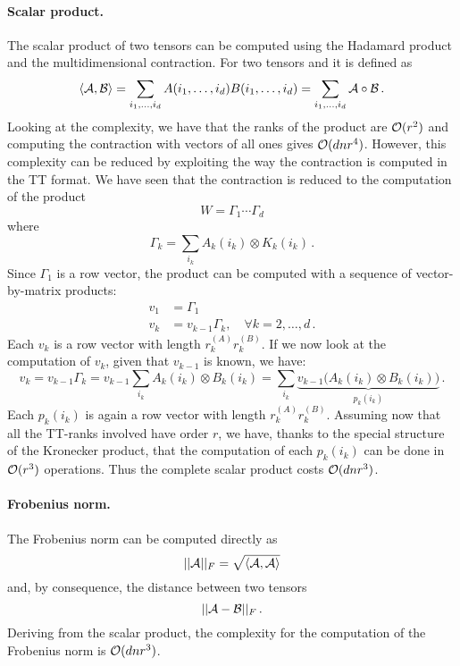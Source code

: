 \paragraph{Scalar product.}
The scalar product of two tensors can be computed using the Hadamard product and the multidimensional contraction. For two tensors \A and \B it is defined as
\begin{equation*}
  \langle \mathcal{A}, \mathcal{B} \rangle = \sum_{i_1,\ldots,i_d} A(i_1,\ldots,i_d)B(i_1,\ldots,i_d) = \sum_{i_1,\ldots,i_d} \mathcal{A} \circ \mathcal{B}\, .
\end{equation*}
Looking at the complexity, we have that the ranks of the product are $\mathcal{O}(r^2)$ and computing the contraction with vectors of all ones gives $\mathcal{O}(dnr^4)$.
However, this complexity can be reduced by exploiting the way the contraction is computed in the TT format. We have seen that the contraction is reduced to the computation of the product
\begin{equation*}
  W = \Gamma_1 \cdots \Gamma_d
\end{equation*}
where
\begin{equation*}
  \Gamma_k = \sum_{i_k}A_k(i_k) \otimes K_k(i_k)\, .
\end{equation*}
Since $\Gamma_1$ is a row vector, the product can be computed with a sequence of vector-by-matrix products:
\begin{equation*}
  \begin{split}
    v_1 &= \Gamma_1\\
    v_k &= v_{k-1} \Gamma_k, \quad \forall k = 2,\ldots,d\, .
  \end{split}
\end{equation*}
Each $v_k$ is a row vector with length $r_k^{(A)} r_k^{(B)}$. If we now look at the computation of $v_k$, given that $v_{k-1}$ is known, we have:
\begin{equation*}
  v_k = v_{k-1} \Gamma_k = v_{k-1} \sum_{i_k} A_k(i_k) \otimes B_k(i_k) = \sum_{i_k} \underbrace{v_{k-1} \Big( A_k(i_k) \otimes B_k(i_k) \Big) }_{p_k(i_k)}\, .
\end{equation*}
Each $p_k(i_k)$ is again a row vector with length $r_k^{(A)} r_k^{(B)}$.
Assuming now that all the TT-ranks involved have order $r$, we have, thanks to the special structure of the Kronecker product, that the computation of each $p_k(i_k)$ can be done in $\mathcal{O}(r^3)$ operations. Thus the complete scalar product costs $\mathcal{O}(dnr^3)$.

\paragraph{Frobenius norm.}
The Frobenius norm can be computed directly as
\begin{equation*}
  ||\mathcal{A}||_F = \sqrt{\langle \mathcal{A}, \mathcal{A} \rangle}
\end{equation*}
and, by consequence, the distance between two tensors
\begin{equation*}
  ||\mathcal{A} - \mathcal{B}||_F\, .
\end{equation*}
Deriving from the scalar product, the complexity for the computation of the Frobenius norm is $\mathcal{O}(dnr^3)$.

